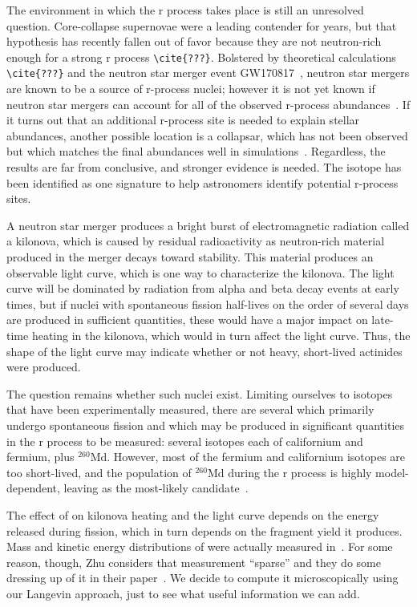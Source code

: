 The environment in which the r process takes place is still an unresolved question. Core-collapse supernovae were a leading contender for years, but that hypothesis has recently fallen out of favor because they are not neutron-rich enough for a strong r process \verb|\cite{???}|. Bolstered by theoretical calculations \verb|\cite{???}| and the neutron star merger event GW170817~\cite{Abbott2017,Abbott2017a}, neutron star mergers are known to be a source of r-process nuclei; however it is not yet known if neutron star mergers can account for all of the observed r-process abundances~\cite{Pian2017,Kasen2017}. If it turns out that an additional r-process site is needed to explain stellar abundances, another possible location is a collapsar, which has not been observed but which matches the final abundances well in simulations~\cite{Nakamura2013,Siegel2018}. Regardless, the results are far from conclusive, and stronger evidence is needed. The isotope {\Cf} has been identified as one signature to help astronomers identify potential r-process sites.

A neutron star merger produces a bright burst of electromagnetic radiation called a kilonova, which is caused by residual radioactivity as neutron-rich material produced in the merger decays toward stability. This material produces an observable light curve, which is one way to characterize the kilonova. The light curve will be dominated by radiation from alpha and beta decay events at early times, but if nuclei with spontaneous fission half-lives on the order of several days are produced in sufficient quantities, these would have a major impact on late-time heating in the kilonova, which would in turn affect the light curve. Thus, the shape of the light curve may indicate whether or not heavy, short-lived actinides were produced.

The question remains whether such nuclei exist. Limiting ourselves to isotopes that have been experimentally measured, there are several which primarily undergo spontaneous fission and which may be produced in significant quantities in the r process to be measured: several isotopes each of californium and fermium, plus $^{260}$Md. However, most of the fermium and californium isotopes are too short-lived, and the population of $^{260}$Md during the r process is highly model-dependent, leaving {\Cf} as the most-likely candidate~\cite{Zhu2018}.


The effect of {\Cf} on kilonova heating and the light curve depends on the energy released during fission, which in turn depends on the fragment yield it produces. Mass and kinetic energy distributions of {\Cf} were actually measured in~\cite{Brandt1963}. For some reason, though, Zhu considers that measurement ``sparse'' and they do some dressing up of it in their paper~\cite{Zhu2018}. We decide to compute it microscopically using our Langevin approach, just to see what useful information we can add.



